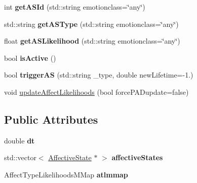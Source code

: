 \begin{DoxyCompactItemize}
\item 
\hypertarget{class_emotion_container_a3222476a63c2f978a29d416b7da1d1a3}{
int {\bfseries get\-A\-S\-Id} (std\-::string emotionclass=\char`\"{}any\char`\"{})}
\label{class_emotion_container_a3222476a63c2f978a29d416b7da1d1a3}

\item 
\hypertarget{class_emotion_container_a2a62a951674e48c4fc7e5721ee8eb5c4}{
std\-::string {\bfseries get\-A\-S\-Type} (std\-::string emotionclass=\char`\"{}any\char`\"{})}
\label{class_emotion_container_a2a62a951674e48c4fc7e5721ee8eb5c4}

\item 
\hypertarget{class_emotion_container_aef8c2ba099d035998c90383fece30e20}{
float {\bfseries get\-A\-S\-Likelihood} (std\-::string emotionclass=\char`\"{}any\char`\"{})}
\label{class_emotion_container_aef8c2ba099d035998c90383fece30e20}

\item 
\hypertarget{class_emotion_container_a7b6b49c2ec038157fee83e1f7c6afc51}{
bool {\bfseries is\-Active} ()}
\label{class_emotion_container_a7b6b49c2ec038157fee83e1f7c6afc51}

\item 
\hypertarget{class_emotion_container_a8edcf7d2c76e3a49d09f4cb1ea1b6c43}{
bool {\bfseries trigger\-A\-S} (std\-::string \-\_\-type, double new\-Lifetime=-\/1.)}
\label{class_emotion_container_a8edcf7d2c76e3a49d09f4cb1ea1b6c43}

\item 
void \hyperlink{class_emotion_container_a2438c1f0119baf3f3df140f246d50783}{update\-Affect\-Likelihoods} (bool force\-P\-A\-Dupdate=false)
\end{DoxyCompactItemize}
\subsection*{\-Public \-Attributes}
\begin{DoxyCompactItemize}
\item 
\hypertarget{class_emotion_container_af50ab9b2b4955a337b9659ce4f795fed}{
double {\bfseries dt}}
\label{class_emotion_container_af50ab9b2b4955a337b9659ce4f795fed}

\item 
\hypertarget{class_emotion_container_ac84d0dcd287bce8986c76e84bd46bbd9}{
std\-::vector$<$ \hyperlink{class_affective_state}{\-Affective\-State} $\ast$ $>$ {\bfseries affective\-States}}
\label{class_emotion_container_ac84d0dcd287bce8986c76e84bd46bbd9}

\item 
\hypertarget{class_emotion_container_af004404f7cf8b28c0be3b6875fda153a}{
\-Affect\-Type\-Likelihoods\-M\-Map {\bfseries atlmmap}}
\label{class_emotion_container_af004404f7cf8b28c0be3b6875fda153a}

\end{DoxyCompactItemize}
